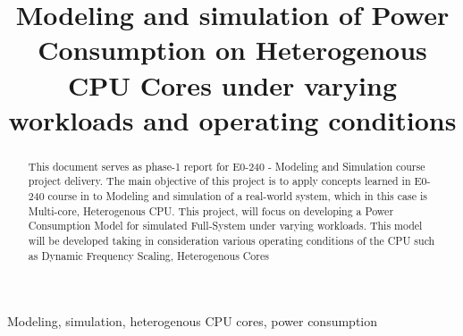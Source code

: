 \documentclass[conference]{IEEEtran}
\begin{document}
\title{Modeling and simulation of Power Consumption on Heterogenous CPU Cores under varying workloads and operating conditions\\

}

\author{
\and
{}
\and
{}
\and
{}
}

\maketitle

\begin{abstract}
    This document serves as phase-1 report for E0-240 - Modeling and Simulation course project delivery. The main objective of this project is to apply concepts learned in E0-240 course in to Modeling and simulation of a real-world system, which in this case is Multi-core, Heterogenous CPU. This project, will focus on developing a Power Consumption Model for simulated Full-System \cite{8718630} under varying workloads. This model will be developed taking in consideration various operating conditions of the CPU such as Dynamic Frequency Scaling, Heterogenous Cores \cite{arm-big.little-whitepaper}
\end{abstract}

\begin{IEEEkeywords}
    Modeling, simulation, heterogenous CPU cores, power consumption
\end{IEEEkeywords}
\end{document}
